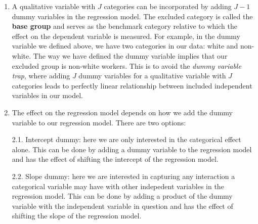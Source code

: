\documentclass[
]{book}
\theoremstyle{definition}
\theoremstyle{definition}
\theoremstyle{definition}
\theoremstyle{definition}
\theoremstyle{remark}
\begin{document}
\begin{enumerate}
\def\labelenumi{\arabic{enumi}.}
\item
  A qualitative variable with \(J\) categories can be incorporated by adding \(J-1\) dummy variables in the regression model. The excluded category is called the \textbf{base group} and serves as the benchmark category relative to which the effect on the dependent variable is measured. For example, in the dummy variable we defined above, we have two categories in our data: white and non-white. The way we have defined the dummy variable implies that our excluded group is non-white workers. This is to avoid the \emph{dummy variable trap}, where adding \(J\) dummy variables for a qualitative variable with \(J\) categories leads to perfectly linear relationship between included independent variables in our model.
\item
  The effect on the regression model depends on how we add the dummy variable to our regression model. There are two options:

  2.1. Intercept dummy: here we are only interested in the categorical effect alone. This can be done by adding a dummy variable to the regression model and has the effect of shifting the intercept of the regression model.

  2.2. Slope dummy: here we are interested in capturing any interaction a categorical variable may have with other indepedent variables in the regression model. This can be done by adding a product of the dummy variable with the independent variable in question and has the effect of shifting the slope of the regression model.
\end{enumerate}
\end{document}
